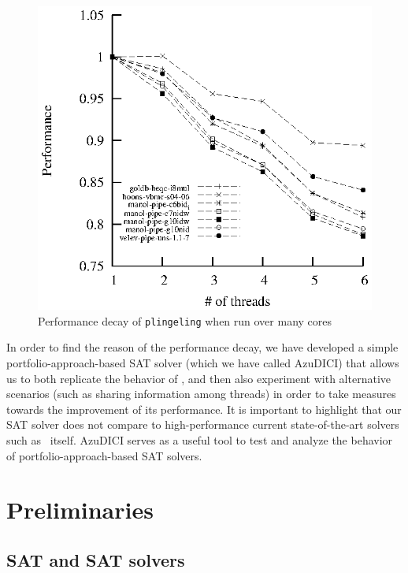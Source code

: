 \documentclass{llncs}
\begin{document}
\begin{figure}[tp]
  \centering
  \includegraphics[scale=1]{plingeling_6cores_speedup}
  \caption{Performance decay of {\tt plingeling} when run over many cores}
  \label{fig:decay}
\end{figure}

In order to find the reason of the performance decay, we have
developed a simple portfolio-approach-based SAT solver (which we have
called AzuDICI) that allows us to both replicate the behavior of
\pling, and then also experiment with alternative scenarios (such as
sharing information among threads) in order to take measures towards
the improvement of its performance. It is important to highlight that
our SAT solver does not compare to high-performance current
state-of-the-art solvers such as \pling\ itself. AzuDICI serves as a
useful tool to test and analyze the behavior of
portfolio-approach-based SAT solvers.


\section{Preliminaries}
\label{sec:preliminaries}
\subsection{SAT and SAT solvers}
\end{document}
